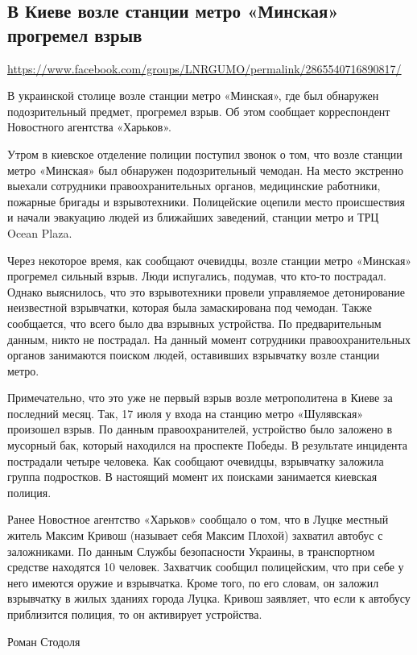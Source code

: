  
 
\subsection{В Киеве возле станции метро «Минская» прогремел взрыв}
\label{sec:21_07_2020.fb.lnr.7}
\url{https://www.facebook.com/groups/LNRGUMO/permalink/2865540716890817/}
  
  
В украинской столице возле станции метро «Минская», где был обнаружен
подозрительный предмет, прогремел взрыв. Об этом сообщает корреспондент
Новостного агентства «Харьков». 

Утром в киевское отделение полиции поступил звонок о том, что возле станции
метро «Минская» был обнаружен подозрительный чемодан. На место экстренно
выехали сотрудники правоохранительных органов, медицинские работники, пожарные
бригады и взрывотехники. Полицейские оцепили место происшествия и начали
эвакуацию людей из ближайших заведений, станции метро и ТРЦ Ocean Plaza. 

Через некоторое время, как сообщают очевидцы, возле станции метро «Минская»
прогремел сильный взрыв. Люди испугались, подумав, что кто-то пострадал. Однако
выяснилось, что это взрывотехники провели управляемое детонирование неизвестной
взрывчатки, которая была замаскирована под чемодан. Также сообщается, что всего
было два взрывных устройства. По предварительным данным, никто не пострадал. На
данный момент сотрудники правоохранительных органов занимаются поиском людей,
оставивших взрывчатку возле станции метро. 

Примечательно, что это уже не первый взрыв возле метрополитена в Киеве за
последний месяц. Так, 17 июля у входа на станцию метро «Шулявская» произошел
взрыв. По данным правоохранителей, устройство было заложено в мусорный бак,
который находился на проспекте Победы. В результате инцидента пострадали четыре
человека. Как сообщают очевидцы, взрывчатку заложила группа подростков. В
настоящий момент их поисками занимается киевская полиция. 


Ранее Новостное агентство «Харьков» сообщало о том, что в Луцке местный житель
Максим Кривош (называет себя Максим Плохой) захватил автобус с заложниками. По
данным Службы безопасности Украины, в транспортном средстве находятся 10
человек. Захватчик сообщил полицейским, что при себе у него имеются оружие и
взрывчатка. Кроме того, по его словам, он заложил взрывчатку в жилых зданиях
города Луцка. Кривош заявляет, что если к автобусу приблизится полиция, то он
активирует устройства. 

Роман Стодоля 
